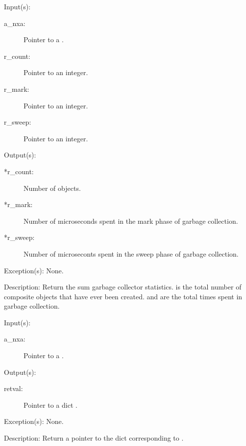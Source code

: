 \begin{capi}
\begin{capilist}
	\end{capilist}
\label{nxa_sum_get}
	\begin{capilist}
	\item[Input(s): ]
		\begin{description}\item[]
		\item[a\_nxa: ]
			Pointer to a .
		\item[r\_count: ]
			Pointer to an integer.
		\item[r\_mark: ]
			Pointer to an integer.
		\item[r\_sweep: ]
			Pointer to an integer.
		\end{description}
	\item[Output(s): ]
		\begin{description}\item[]
		\item[*r\_count: ]
			Number of objects.
		\item[*r\_mark: ]
			Number of microseconds spent in the mark phase of
			garbage collection.
		\item[*r\_sweep: ]
			Number of microseconts spent in the sweep phase of
			garbage collection.
		\end{description}
	\item[Exception(s): ] None.
	\item[Description: ]
		Return the sum garbage collector statistics.
		 is the total number of composite objects that
		have ever been created.   and 
		are the total times spent in garbage collection.
	\end{capilist}
\label{nxa_gcdict_get}
	\begin{capilist}
	\item[Input(s): ]
		\begin{description}\item[]
		\item[a\_nxa: ]
			Pointer to a \classname{nxa}.
		\end{description}
	\item[Output(s): ]
		\begin{description}\item[]
		\item[retval: ]
			Pointer to a dict \classname{nxo}.
		\end{description}
	\item[Exception(s): ] None.
	\item[Description: ]
		Return a pointer to the dict  corresponding to
		\onyxop{gcdict}{}.
	\end{capilist}
\end{capi}
